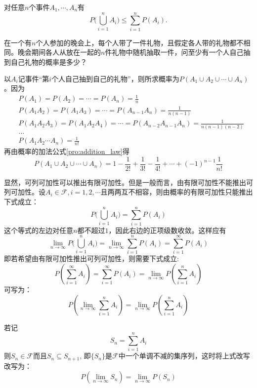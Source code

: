 \begin{corollary}
    对任意$n$个事件$A_1,\cdots ,A_n$有
    \[ P \biggl( \bigcup_{i=1}^n A_i \biggr) \le \sum_{i=1}^n P(A_i). \]
\end{corollary}

\begin{example}[配对问题]\label{exam:pairing}
    在一个有$n$个人参加的晚会上，每个人带了一件礼物，且假定各人带的礼物都不相同。晚会期间各人从放在一起的$n$件礼物中随机抽取一件，问至少有一个人自己抽到自己礼物的概率是多少？
\end{example}

\begin{solution}
    以$A_i$记事件“第$i$个人自己抽到自己的礼物”，则所求概率为$P(A_1 \cup A_2 \cup \dotsb \cup A_n)$。因为
    \begin{align*}
         & P(A_1) = P(A_2) = \dotsb = P(A_n) =\frac1{n}                                              \\
         & P(A_1 A_2) = P(A_1 A_3) = \dotsb = P(A_{n-1} A_n) = \frac1{n (n-1)}                       \\
         & P(A_1 A_2 A_3) = P(A_1 A_2 A_4) = \dotsb = P(A_{n-2} A_{n-1} A_n) = \frac1{n (n-1) (n-2)} \\
         & \ldots                                                                                    \\
         & P(A_1 A_2 \dotsb A_n) = \frac1{n!}
    \end{align*}
    再由概率的加法公式\ref{pro:addition_law}得
    \[ P(A_1 \cup A_2 \cup \dotsb \cup A_n) = 1 - \frac1{2!} + \frac1{3!} - \frac1{4!} + \dotsb + (-1)^{n-1} \frac1{n!} \]
\end{solution}

显然，可列可加性可以推出有限可加性。但是一般而言，由有限可加性不能推出可列可加性。设$A_i \in \mathscr{F}, i=1,2,\cdots$且两两互不相容，则由概率的有限可加性只能推出下式成立：
\[ P\biggl( \bigcup_{i=1}^n A_i \biggr)=\sum_{i=1}^n P(A_i) \]
这个等式的左边对任意$n$都不超过$1$，因此右边的正项级数收敛。这样应有
\[ \lim_{n \to \infty}P\biggl(\bigcup_{i=1}^n A_i \biggr) =\lim_{n \to \infty}\sum_{i=1}^n P(A_i)=\sum_{i=1}^{\infty} P(A_i) \]
即若希望由有限可加性推出可列可加性，则需要下式成立:
\[ P(\sum_{i=1}^{\infty} A_i)=\sum_{i=1}^{\infty} P(A_i)=\lim_{n \to \infty}P(\sum_{i=1}^n A_i) \]
可写为：
\[ P(\lim_{n \to \infty}\sum_{i=1}^{n} A_i)=\lim_{n \to \infty}P(\sum_{i=1}^n A_i) \]

若记
\[ S_n=\sum_{i=1}^n A_i \]
则$S_n \in \mathscr{F}$而且$S_n \subseteq S_{n+1}$, 即$\{ S_n \}$是$\mathscr{F}$中一个单调不减的集序列，这时将上式改写改写为：
\[ P(\lim_{n \to \infty}S_n)=\lim_{n \to \infty}P(S_n) \]

